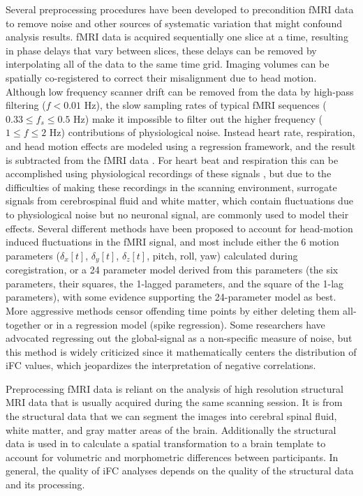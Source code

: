 Several preprocessing procedures have been developed to precondition fMRI data to remove noise and other sources of systematic variation that might confound analysis results. fMRI data is acquired sequentially one slice at a time, resulting in phase delays that vary between slices, these delays can be removed by interpolating all of the data to the same time grid. Imaging volumes can be spatially co-registered to correct their misalignment due to head motion. Although low frequency scanner drift can be removed from the data by high-pass filtering ($f<0.01$  \si{\hertz}), the slow sampling rates of typical fMRI sequences ($0.33 \leq f_s \leq 0.5$ \si{\hertz}) make it impossible to filter out the higher frequency ($1 \leq f \leq 2$ \si{\hertz}) contributions of physiological noise. Instead heart rate, respiration, and head motion effects are modeled using a regression framework, and the result is subtracted from the fMRI data \cite{lund_nvr}. For heart beat and respiration this can be accomplished using physiological recordings of these signals \cite{Hu1999,Glover2002}, but due to the difficulties of making these recordings in the scanning environment, surrogate signals from cerebrospinal fluid and white matter, which contain fluctuations due to physiological noise but no neuronal signal, are commonly used to model their effects. Several different methods have been proposed to account for head-motion induced fluctuations in the fMRI signal, and most include either the 6 motion parameters ($\delta_{x}[t]$, $\delta_{y}[t]$, $\delta_{z}[t]$, pitch, roll, yaw) calculated during coregistration\cite{fox2005}, or a 24 parameter model derived from this parameters (the six parameters, their squares, the 1-lagged parameters, and the square of the 1-lag parameters)\cite{friston1996}, with some evidence supporting the 24-parameter model as best\cite{Yan2013, Satterthwaite2013}. More aggressive methods censor offending time points by either deleting them all-together\cite{Power2012} or in a regression model (spike regression)\cite{gabrieli-whitefield}. Some researchers have advocated regressing out the global-signal as a non-specific measure of noise\cite{fox_response}, but this method is widely criticized since it mathematically centers the distribution of iFC values, which jeopardizes the interpretation of negative correlations\cite{kevin,saad}.  

Preprocessing fMRI data is reliant on the analysis of high resolution structural MRI data that is usually acquired during the same scanning session. It is from the structural data that we can segment the images into cerebral spinal fluid, white matter, and gray matter areas of the brain. Additionally the structural data is used in to calculate a spatial transformation to a brain template to account for volumetric and morphometric differences between participants. In general, the quality of iFC analyses depends on the quality of the structural data and its processing.

